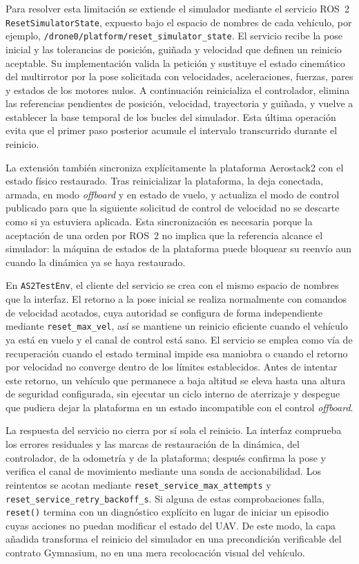 Para resolver esta limitación se extiende el simulador mediante el servicio ROS~2
\texttt{ResetSimulatorState}, expuesto bajo el espacio de nombres de cada
vehículo, por ejemplo,
\texttt{/drone0/platform/reset\_simulator\_state}. El servicio recibe la pose
inicial y las tolerancias de posición, guiñada y velocidad que definen un
reinicio aceptable. Su implementación valida la petición y sustituye el estado
cinemático del multirrotor por la pose solicitada con velocidades, aceleraciones,
fuerzas, pares y estados de los motores nulos. A continuación reinicializa el
controlador, elimina las referencias pendientes
de posición, velocidad, trayectoria y guiñada, y vuelve a establecer la base
temporal de los bucles del simulador. Esta última operación evita que el primer
paso posterior acumule el intervalo transcurrido durante el reinicio.

La extensión también sincroniza explícitamente la plataforma Aerostack2 con el
estado físico restaurado. Tras reinicializar la plataforma, la deja conectada,
armada, en modo \emph{offboard} y en estado de vuelo, y actualiza el modo de
control publicado para que la siguiente solicitud de control de velocidad no se
descarte como si ya estuviera aplicada. Esta sincronización es necesaria porque
la aceptación de una orden por ROS~2 no implica que la referencia alcance el
simulador: la máquina de estados de la plataforma puede bloquear su reenvío aun
cuando la dinámica ya se haya restaurado.

En \texttt{AS2TestEnv}, el cliente del servicio se crea con el mismo espacio de
nombres que la interfaz. El retorno a la pose inicial se realiza normalmente con
comandos de velocidad acotados, cuya autoridad se configura de forma
independiente mediante \texttt{reset\_max\_vel}, así se mantiene un reinicio
eficiente cuando el vehículo ya está en vuelo y el canal de control está sano.
El servicio se emplea como vía de recuperación cuando el estado terminal impide
esa maniobra o cuando el retorno por velocidad no converge dentro de los límites
establecidos. Antes de intentar este retorno, un vehículo que permanece a baja
altitud se eleva hasta una altura de seguridad configurada, sin ejecutar un
ciclo interno de aterrizaje y despegue que pudiera dejar la plataforma en un
estado incompatible con el control \emph{offboard}.

La respuesta del servicio no cierra por sí sola el reinicio. La interfaz comprueba
los errores residuales y las marcas de restauración de la dinámica, del
controlador, de la odometría y de la plataforma; después confirma la pose y
verifica el canal de movimiento mediante una sonda de accionabilidad. Los
reintentos se acotan mediante \texttt{reset\_service\_max\_attempts} y
\texttt{reset\_service\_retry\_backoff\_s}. Si alguna de estas comprobaciones
falla, \texttt{reset()} termina con un diagnóstico explícito en lugar de iniciar
un episodio cuyas acciones no puedan modificar el estado del UAV. De este modo,
la capa añadida transforma el reinicio del simulador en una precondición
verificable del contrato Gymnasium, no en una mera recolocación visual del
vehículo.


